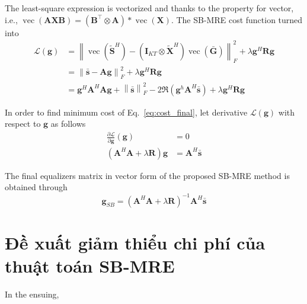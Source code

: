 The least-square expression is vectorized and thanks to the property for vector, i.e., $\operatorname{vec}(\mathbf{AXB}) = (\mathbf{B}^\top \otimes \mathbf{A}) * \operatorname{vec}(\mathbf{X})$. The SB-MRE cost function turned into
\begin{equation}
\label{eq:cost_final}
    \begin{aligned}
    \mathcal{L}(\mathbf{g}) &= \left\|\operatorname{vec}(\widetilde{\mathbf{S}}^H) - (\mathbf{I}_{KT} \otimes \widetilde{\mathbf{X}}^H) \operatorname{vec}(\bar{\mathbf{G}})\right\|^2_F + \lambda \mathbf{g}^H \mathbf{R} \mathbf{g}\\
         &= \left\| \bar{\mathbf{s}} - \mathbf{A} \mathbf{g} \right\|^2_F + \lambda \mathbf{g}^H \mathbf{R} \mathbf{g} \\
         &= \mathbf{g}^H \mathbf{A}^H \mathbf{A} \mathbf{g} + \left\| \bar{\mathbf{s}} \right\|^2_F - 2\Re (\mathbf{g}^h \mathbf{A}^H \bar{\mathbf{s}}) + \lambda \mathbf{g}^H \mathbf{R} \mathbf{g}    \end{aligned}
\end{equation}

In order to find minimum cost of Eq.~\ref{eq:cost_final}, let derivative $\mathcal{L}(\mathbf{g})$ with respect to $\mathbf{g}$ as follows
\begin{equation}
\begin{aligned}
\frac{\partial \mathcal{L}}{\partial \mathbf{g}}(\mathbf{g}) &= 0 \\
\left(\mathbf{A}^H \mathbf{A}+\lambda \mathbf{R}\right) \mathbf{g} &= \mathbf{A}^H \bar{\mathbf{s}}
\end{aligned}
\end{equation}

The final equalizers matrix in vector form of the proposed SB-MRE method is obtained through
\begin{equation}
    \mathbf{g}_{SB}=\left(\mathbf{A}^H \mathbf{A} + \lambda \mathbf{R}\right)^{-1} \mathbf{A}^H \bar{\mathbf{s}}
\end{equation}

\section{Đề xuất giảm thiểu chi phí của thuật toán SB-MRE}


In the ensuing, 

